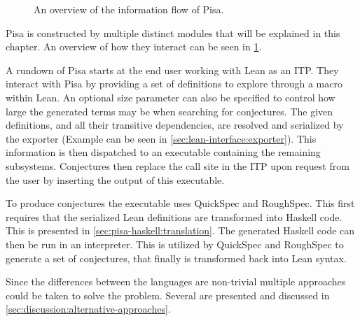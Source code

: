 \vspace{-0.8cm}
\begin{figure}[H]
  \centering
  
  \caption{An overview of the information flow of Pisa.}\label{fig:overview}
\end{figure}
\vspace{-0.3cm}

Pisa is constructed by multiple distinct modules that will be explained in this chapter.
An overview of how they interact can be seen in \cref{fig:overview}.

A rundown of Pisa starts at the end user working with Lean as an ITP.
They interact with Pisa by providing a set of definitions to explore through a macro within Lean.
An optional size parameter can also be specified to control how large the generated terms may be when searching for conjectures.
The given definitions, and all their transitive dependencies, are resolved and serialized by the exporter (Example can be seen in \cref{sec:lean-interface:exporter}).
This information is then dispatched to an executable containing the remaining subsystems.
Conjectures then replace the call site in the ITP upon request from the user by inserting the output of this executable.

To produce conjectures the executable uses QuickSpec and RoughSpec.
This first requires that the serialized Lean definitions are transformed into Haskell code.
This is presented in \cref{sec:pisa-haskell:translation}.
The generated Haskell code can then be run in an interpreter.
This is utilized by QuickSpec and RoughSpec to generate a set of conjectures, that finally is transformed back into Lean syntax.

Since the differences between the languages are non-trivial multiple approaches could be taken to solve the problem.
Several are presented and discussed in \cref{sec:discussion:alternative-approaches}.

